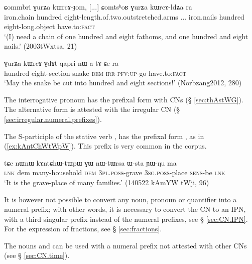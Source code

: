 \begin{exe}
\ex \label{ex:GurZa.kWrCAJom}
\gll ɕommbri ɣurʑa kɯrcɤ-ɟom, [...] ɕomtsʰoʁ ɣurʑa kɯrcɤ-ldʑa ra \\
 iron.chain hundred eight-length.of.two.outstretched.arms ... iron.nails hundred eight-long.object have.to:\textsc{fact} \\
\glt  `(I) need a chain of one hundred and eight fathoms, and one hundred and eight nails.' (2003tWxtsa, 21)
\end{exe}

\begin{exe}
\ex \label{ex:GurZa.kWrCAGdAt}
\gll  ɣurʑa kɯrcɤ-ɣdɤt qapri nɯ a-tɤ-ɕe ra \\
 hundred eight-section snake \textsc{dem} \textsc{irr}-\textsc{pfv}:\textsc{up}-go have.to:\textsc{fact} \\
\glt `May the snake be cut into hundred and eight sections!' (Norbzang2012,  280)
\end{exe}

The interrogative pronoun  has the prefixal form  with CNs (§  \ref{sec:thAstWG}). The alternative form  is attested with the irregular  CN  (§ \ref{sec:irregular.numeral.prefixes}).

The S-participle   of the stative verb ,  has the prefixal form , as in (\ref{ex:kAntChWtWpW}). This prefix is very common in the corpus.

\begin{exe}
\ex \label{ex:kAntChWtWpW}
\gll  tɕe nɯnɯ kɤntɕhɯ-tɯpɯ ɣɯ nɯ-tɯrsa ɯ-sta ɲɯ-ŋu ma \\
 \textsc{lnk} dem many-household \textsc{dem} \textsc{3pl}.\textsc{poss}-grave \textsc{3sg}.\textsc{poss}-place \textsc{sens}-be \textsc{lnk} \\
\glt `It is the grave-place of many families.' (140522 kAmYW tWji, 96)
\end{exe}

It is however not possible to convert any noun, pronoun or quantifier into a numeral prefix; with other words, it is necessary to convert the CN to an IPN, with a third singular  prefix instead of the numeral prefixes, see § \ref{sec:CN.IPN}. For the expression of fractions, see § \ref{sec:fractions}.

The nouns  and  can be used with a numeral prefix  not attested with other CNs (see § \ref{sec:CN.time}).

